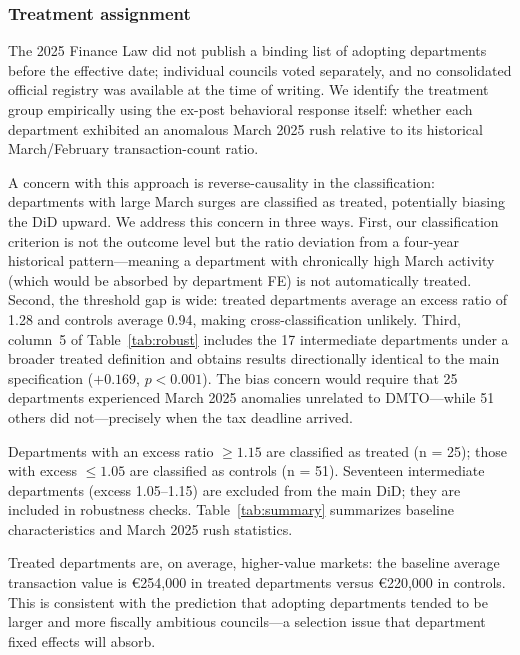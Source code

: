 \documentclass[12pt]{article}
\begin{document}
\subsubsection*{Treatment assignment}
The 2025 Finance Law did not publish a binding list of adopting departments before the
effective date; individual councils voted separately, and no consolidated official registry
was available at the time of writing. We identify the treatment group empirically using the
ex-post behavioral response itself: whether each department exhibited an anomalous March 2025
rush relative to its historical March/February transaction-count ratio.

A concern with this approach is reverse-causality in the classification: departments with large
March surges are classified as treated, potentially biasing the DiD upward. We address this
concern in three ways. First, our classification criterion is not the outcome level but the
ratio deviation from a four-year historical pattern---meaning a department with chronically high
March activity (which would be absorbed by department FE) is not automatically treated.
Second, the threshold gap is wide: treated departments average an excess ratio of 1.28 and
controls average 0.94, making cross-classification unlikely. Third, column~5 of
Table~\ref{tab:robust} includes the 17 intermediate departments under a broader treated definition
and obtains results directionally identical to the main specification ($+0.169$, $p < 0.001$).
The bias concern would require that 25 departments experienced March 2025 anomalies unrelated
to DMTO---while 51 others did not---precisely when the tax deadline arrived.

Departments with an excess ratio $\geq 1.15$ are classified as treated (n = 25); those with
excess $\leq 1.05$ are classified as controls (n = 51). Seventeen intermediate departments
(excess 1.05--1.15) are excluded from the main DiD; they are included in robustness checks.
Table~\ref{tab:summary} summarizes baseline characteristics and March 2025 rush statistics.

Treated departments are, on average, higher-value markets: the baseline average transaction value
is \euro{}254,000 in treated departments versus \euro{}220,000 in controls. This is consistent
with the prediction that adopting departments tended to be larger and more fiscally ambitious
councils—a selection issue that department fixed effects will absorb.



\end{document}
